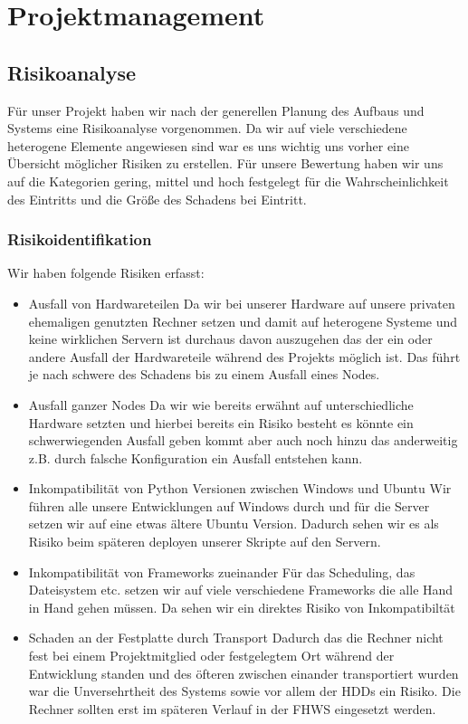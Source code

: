 \documentclass[12pt,oneside,a4paper,parskip]{scrbook}
\begin{document}
\chapter{Projektmanagement}
\section{Risikoanalyse}
Für unser Projekt haben wir nach der generellen Planung des Aufbaus und Systems eine Risikoanalyse vorgenommen. Da wir auf viele verschiedene heterogene Elemente angewiesen sind war es uns wichtig uns vorher eine Übersicht möglicher Risiken zu erstellen. Für unsere Bewertung haben wir uns auf die Kategorien {gering, mittel und hoch} festgelegt für die Wahrscheinlichkeit des Eintritts und die Größe des Schadens bei Eintritt.
\subsection{Risikoidentifikation}
Wir haben folgende Risiken erfasst:

\begin{itemize}
\item Ausfall von Hardwareteilen
Da wir bei unserer Hardware auf unsere privaten ehemaligen genutzten Rechner setzen und damit auf heterogene Systeme und keine wirklichen Servern ist durchaus davon auszugehen das der ein oder andere Ausfall der Hardwareteile während des Projekts möglich ist. Das führt je nach schwere des Schadens bis zu einem Ausfall eines Nodes.
\item Ausfall ganzer Nodes
Da wir wie bereits erwähnt auf unterschiedliche Hardware setzten und hierbei bereits ein Risiko besteht es könnte ein schwerwiegenden Ausfall geben kommt aber auch noch hinzu das anderweitig z.B. durch falsche Konfiguration ein Ausfall entstehen kann.
\item Inkompatibilität von Python Versionen zwischen Windows und Ubuntu
Wir führen alle unsere Entwicklungen auf Windows durch und für die Server setzen wir auf eine etwas ältere Ubuntu Version. Dadurch sehen wir es als Risiko beim späteren deployen unserer Skripte auf den Servern.
\item Inkompatibilität von Frameworks zueinander
Für das Scheduling, das Dateisystem etc. setzen wir auf viele verschiedene Frameworks die alle Hand in Hand gehen müssen. Da sehen wir ein direktes Risiko von Inkompatibiltät
\item Schaden an der Festplatte durch Transport
Dadurch das die Rechner nicht fest bei einem Projektmitglied oder festgelegtem Ort während der Entwicklung standen und des öfteren zwischen einander
transportiert wurden war die Unversehrtheit des Systems sowie vor allem der HDDs ein Risiko. Die Rechner sollten erst im späteren Verlauf in der FHWS eingesetzt werden.
\end{itemize}
\end{document}
